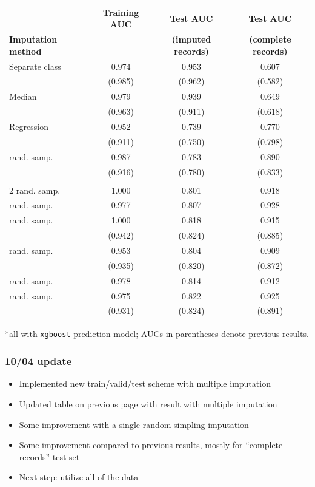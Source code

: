 \documentclass[12pt]{article}
\begin{document}
\begin{table}[ht]
\centering
\begin{tabular}{lccc}
  \toprule
 & \textbf{Training AUC} & \textbf{Test AUC} & \textbf{Test AUC} \\
\textbf{Imputation method}& & \textbf{(imputed records)} & \textbf{(complete records)} \\
  \midrule
Separate class & 0.974 & 0.953 & 0.607 \\ 
 & (0.985) & (0.962) & (0.582) \\ \addlinespace
Median & 0.979 & 0.939 & 0.649 \\
   & (0.963) & (0.911) & (0.618) \\ \addlinespace
Regression & 0.952 & 0.739 & 0.770 \\ 
   & (0.911) & (0.750) & (0.798) \\ \addlinespace
1 rand. samp. & 0.987 & 0.783 & 0.890 \\
   & (0.916) & (0.780) & (0.833) \\  \addlinespace
   \midrule
   \multicolumn{4}{c}{10/04 update} \\
   \midrule
2 rand. samp. & 1.000 & 0.801 & 0.918 \\  \addlinespace
5 rand. samp. & 0.977 & 0.807 & 0.928 \\  \addlinespace
10 rand. samp. & 1.000 & 0.818 & 0.915 \\ 
   & (0.942) & (0.824) & (0.885) \\ \addlinespace
20 rand. samp. & 0.953 & 0.804 & 0.909 \\ 
   & (0.935) & (0.820) & (0.872) \\ \addlinespace
50 rand. samp. & 0.978 & 0.814 & 0.912 \\ \addlinespace
100 rand. samp. &  0.975 & 0.822 & 0.925 \\ 
   & (0.931) & (0.824) & (0.891) \\ 
   \bottomrule
\end{tabular}
   *all with \texttt{xgboost} prediction model; AUCs in parentheses 
   denote previous results.
\end{table}


\pagebreak
\subsubsection*{10/04 update}

\begin{itemize}
	\item Implemented new train/valid/test scheme with multiple imputation
	\item Updated table on previous page with result with multiple imputation
	\item Some improvement with a single random simpling imputation
	\item Some improvement compared to previous results, mostly for ``complete records'' test set
	\item Next step: utilize all of the data
\end{itemize}
\end{document}
